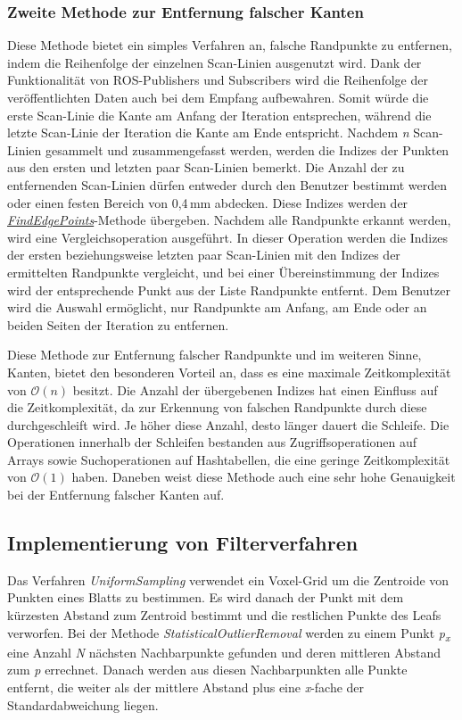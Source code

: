 \subsubsection{Zweite Methode zur Entfernung falscher Kanten}
Diese Methode bietet ein simples Verfahren an, falsche Randpunkte zu entfernen, indem die Reihenfolge der einzelnen Scan-Linien ausgenutzt wird. Dank der Funktionalität von ROS-Publishers und Subscribers wird die Reihenfolge der veröffentlichten Daten auch bei dem Empfang aufbewahren. Somit würde die erste Scan-Linie die Kante am Anfang der Iteration entsprechen, während die letzte Scan-Linie der Iteration die Kante am Ende entspricht. Nachdem \textit{n} Scan-Linien gesammelt und zusammengefasst werden, werden die Indizes der Punkten aus den ersten und letzten paar Scan-Linien bemerkt. Die Anzahl der zu entfernenden Scan-Linien dürfen entweder durch den Benutzer bestimmt werden oder einen festen Bereich von 0,4\,mm abdecken. Diese Indizes werden der \textit{\hyperref[alg:find_edge_points]{FindEdgePoints}}-Methode übergeben. Nachdem alle Randpunkte erkannt werden, wird eine Vergleichsoperation ausgeführt. In dieser Operation werden die Indizes der ersten beziehungsweise letzten paar Scan-Linien mit den Indizes der ermittelten Randpunkte vergleicht, und bei einer Übereinstimmung der Indizes wird der entsprechende Punkt aus der Liste Randpunkte entfernt. Dem Benutzer wird die Auswahl ermöglicht, nur Randpunkte am Anfang, am Ende oder an beiden Seiten der Iteration zu entfernen.

Diese Methode zur Entfernung falscher Randpunkte und im weiteren Sinne, Kanten, bietet den besonderen Vorteil an, dass es eine maximale Zeitkomplexität von $\mathcal{O}(n)$ besitzt. Die Anzahl der übergebenen Indizes hat einen Einfluss auf die Zeitkomplexität, da zur Erkennung von falschen Randpunkte durch diese durchgeschleift wird. Je höher diese Anzahl, desto länger dauert die Schleife. Die Operationen innerhalb der Schleifen bestanden aus Zugriffsoperationen auf Arrays sowie Suchoperationen auf Hashtabellen, die eine geringe Zeitkomplexität von $\mathcal{O}(1)$ haben. Daneben weist diese Methode auch eine sehr hohe Genauigkeit bei der Entfernung falscher Kanten auf.

\subsection{Implementierung von Filterverfahren}
Das Verfahren \textit{UniformSampling} verwendet ein Voxel-Grid um die Zentroide von Punkten eines Blatts zu bestimmen. Es wird danach der Punkt mit dem kürzesten Abstand zum Zentroid bestimmt und die restlichen Punkte des Leafs verworfen. Bei der Methode \textit{StatisticalOutlierRemoval} werden zu einem Punkt \textit{p\textsubscript{x}} eine Anzahl \textit{N} nächsten Nachbarpunkte gefunden und deren mittleren Abstand zum \textit{p} errechnet. Danach werden aus diesen Nachbarpunkten alle Punkte entfernt, die weiter als der mittlere Abstand plus eine \textit{x}-fache der Standardabweichung liegen. \autocite{rusu_3d_2011}

